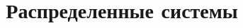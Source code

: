 \documentclass[12pt, a4paper, oneside]{article}
\title{\textbf{Распределенные системы}}
\author{
\\
\\
}
\date{}
\begin{document}
\maketitle
\tableofcontents
\pagebreak

























\end{document}
